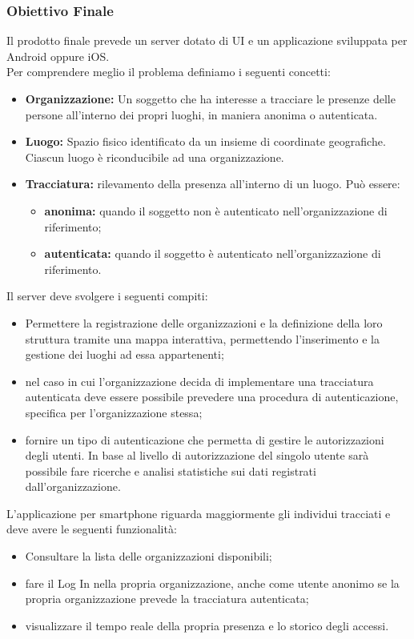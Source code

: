 	\subsubsection{Obiettivo Finale}
	Il prodotto finale prevede un server dotato di UI e un applicazione sviluppata per Android oppure iOS.\\
	Per comprendere meglio il problema definiamo i seguenti concetti:
	\begin{itemize}
		\item \textbf{Organizzazione:} Un soggetto che ha interesse a tracciare le presenze delle persone all'interno dei propri luoghi, in maniera anonima o autenticata.
		\item \textbf{Luogo:} Spazio fisico identificato da un insieme di coordinate geografiche. Ciascun luogo è riconducibile ad una organizzazione. 
		\item \textbf{Tracciatura:}  rilevamento della presenza all'interno di un luogo. Può essere:
		\begin{itemize}
			\item \textbf{anonima:} quando il soggetto non è autenticato nell'organizzazione di riferimento;
			\item \textbf{autenticata:} quando il soggetto è autenticato nell'organizzazione di riferimento.
		\end{itemize}
	\end{itemize}
	Il server deve svolgere i seguenti compiti:
	\begin{itemize}
		\item Permettere la registrazione delle organizzazioni e la definizione della loro struttura tramite una mappa interattiva, permettendo l'inserimento e la gestione dei luoghi ad essa appartenenti; 
		\item nel caso in cui l'organizzazione decida di implementare una tracciatura autenticata deve essere possibile prevedere una procedura di autenticazione, specifica per l'organizzazione stessa;
		\item fornire un tipo di autenticazione che permetta di gestire le autorizzazioni degli utenti. In base al livello di autorizzazione del singolo utente sarà possibile fare ricerche e analisi statistiche sui dati registrati dall'organizzazione.
	\end{itemize}
	L'applicazione per smartphone riguarda maggiormente gli individui tracciati e deve avere le seguenti funzionalità:
	\begin{itemize}
		\item Consultare la lista delle organizzazioni disponibili; 
		\item fare il Log In nella propria organizzazione, anche come utente anonimo se la propria organizzazione prevede la tracciatura autenticata; 
		\item visualizzare il tempo reale della propria presenza e lo storico degli accessi.
	\end{itemize}
